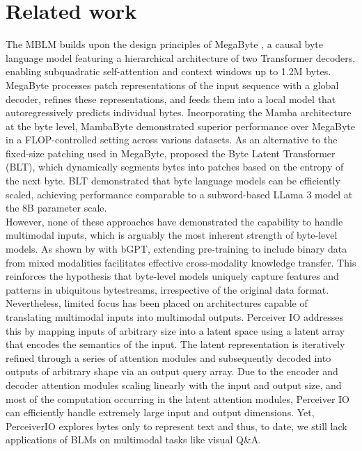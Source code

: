 \section{Related work}
The MBLM builds upon the design principles of MegaByte \cite{megabyte}, a causal byte language model featuring a hierarchical architecture of two Transformer decoders, enabling subquadratic self-attention and context windows up to 1.2M bytes. MegaByte processes patch representations of the input sequence with a global decoder, refines these representations, and feeds them into a local model that autoregressively predicts individual bytes. Incorporating the Mamba architecture \cite{mamba, mamba2} at the byte level, MambaByte \cite{mambabyte} demonstrated superior performance over MegaByte in a FLOP-controlled setting across various datasets. As an alternative to the fixed-size patching used in MegaByte, \citet{pagnoni2024bytelatenttransformerpatches} proposed the Byte Latent Transformer (BLT), which dynamically segments bytes into patches based on the entropy of the next byte. 
BLT demonstrated that byte language models can be efficiently scaled, achieving performance comparable to a subword-based LLama 3 model \cite{grattafiori2024llama3herdmodels} at the 8B parameter scale.\\
However, none of these approaches have demonstrated the capability to handle multimodal inputs, which is arguably the most inherent strength of byte-level models. As shown by \citet{digitalworldsimulators} with bGPT, extending pre-training to include binary data from mixed modalities facilitates effective cross-modality knowledge transfer. This reinforces the hypothesis that byte-level models uniquely capture features and patterns in ubiquitous bytestreams, irrespective of the original data format. Nevertheless, limited focus has been placed on architectures capable of translating multimodal inputs into multimodal outputs. Perceiver IO \cite{jaegle2022perceiverio} addresses this by mapping inputs of arbitrary size into a latent space using a latent array that encodes the semantics of the input. The latent representation is iteratively refined through a series of attention modules and subsequently decoded into outputs of arbitrary shape via an output query array. Due to the encoder and decoder attention modules scaling linearly with the input and output size, and most of the computation occurring in the latent attention modules, Perceiver IO can efficiently handle extremely large input and output dimensions.
Yet, PerceiverIO explores bytes only to represent text and thus, to date, we still lack applications of BLMs on multimodal tasks like visual Q\&A.